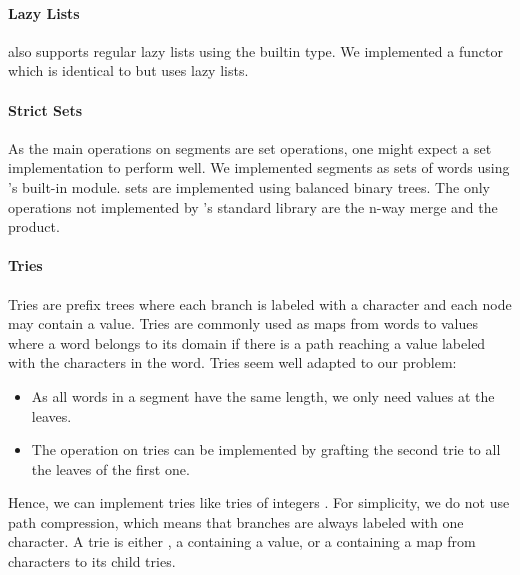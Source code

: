 \paragraph{Lazy Lists}

\ocaml also supports regular lazy lists using the builtin  type.
%
%
We implemented a  functor which is identical to
 but uses lazy lists.

\paragraph{Strict Sets}

As the main operations on segments are set operations, one might 
expect a set implementation to perform well. We implemented segments as sets
of words using \ocaml's built-in  module. \ocaml sets are implemented
using balanced binary trees.
The only operations not implemented by \ocaml's standard library are
the n-way merge and the product.

\paragraph{Tries}

Tries \cite{Fredkin1960} are prefix trees where each branch is labeled
with a character and each node may contain a value. Tries are commonly used
as maps from words to values where a word belongs to its domain if there is a
path reaching a value labeled with the characters in the word.
Tries seem well adapted to our problem:
\begin{itemize}[leftmargin=*]
\item As all words in a segment have the same length, we only need values at the leaves.
\item The  operation on tries can be implemented by
  grafting the second trie to all the leaves of the first one.
\end{itemize}

Hence, we can implement tries like tries of integers \cite{Okasaki98fastmergeable}.
For simplicity, we do not use path compression, which means
that branches are always labeled with one character.
A trie is either , a  containing a value, or a  containing a map from characters
to its child tries.

